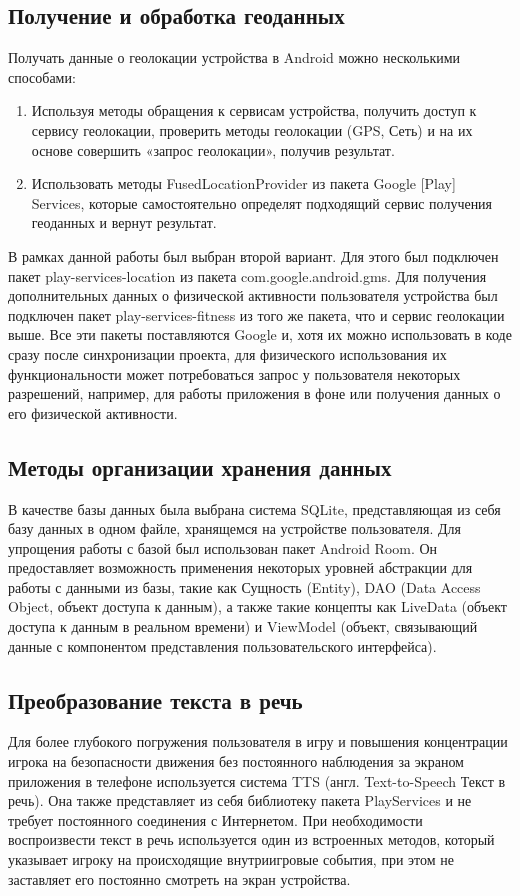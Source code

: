 \subsection{Получение и обработка геоданных}
\label{subsec:geodata}
Получать данные о геолокации устройства в Android можно несколькими способами:
\begin{enumerate}
	\item Используя методы обращения к сервисам устройства, получить доступ к сервису геолокации, проверить методы геолокации (GPS, Сеть) и на их основе совершить «запрос геолокации», получив результат.
	\item Использовать методы FusedLocationProvider из пакета Google [Play] Services, которые самостоятельно определят подходящий сервис получения геоданных и вернут результат.
\end{enumerate}

В рамках данной работы был выбран второй вариант. Для этого был подключен пакет play-services-location из пакета com.google.android.gms.
Для получения дополнительных данных о физической активности пользователя устройства был подключен пакет play-services-fitness из того же пакета, что и сервис геолокации выше.
Все эти пакеты поставляются Google и, хотя их можно использовать в коде сразу после синхронизации проекта, для физического использования их функциональности может потребоваться запрос у пользователя некоторых разрешений, например, для работы приложения в фоне или получения данных о его физической активности.


\subsection{Методы организации хранения данных}
В качестве базы данных была выбрана система SQLite, представляющая из себя базу данных в одном файле, хранящемся на устройстве пользователя.
Для упрощения работы с базой был использован пакет Android Room. Он предоставляет возможность применения некоторых уровней абстракции для работы с данными из базы, такие как Сущность (Entity), DAO (Data Access Object, объект доступа к данным), а также такие концепты как LiveData (объект доступа к данным в реальном времени) и ViewModel (объект, связывающий данные с компонентом представления пользовательского интерфейса).


\subsection{Преобразование текста в речь}
Для более глубокого погружения пользователя в игру и повышения концентрации игрока на безопасности движения без постоянного наблюдения за экраном приложения в телефоне используется система TTS (англ. Text-to-Speech \textemdash\space Текст в речь). Она также представляет из себя библиотеку пакета PlayServices и не требует постоянного соединения с Интернетом. 
При необходимости воспроизвести текст в речь используется один из встроенных методов, который указывает игроку на происходящие внутриигровые события, при этом не заставляет его постоянно смотреть на экран устройства.


